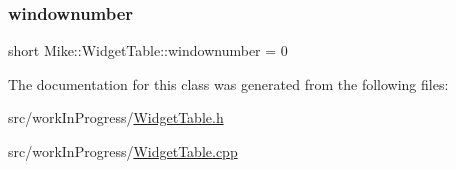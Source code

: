 \mbox{\label{class_mike_1_1_widget_table_a16ce4e53a1c455b630399f87d154e5ed}} 
\subsubsection{\texorpdfstring{windownumber}{windownumber}}
{\footnotesize\ttfamily short Mike\+::\+Widget\+Table\+::windownumber = 0\hspace{0.3cm}{\ttfamily [protected]}}



The documentation for this class was generated from the following files\+:\begin{DoxyCompactItemize}
\item 
src/work\+In\+Progress/\hyperlink{_widget_table_8h}{Widget\+Table.\+h}\item 
src/work\+In\+Progress/\hyperlink{_widget_table_8cpp}{Widget\+Table.\+cpp}\end{DoxyCompactItemize}
